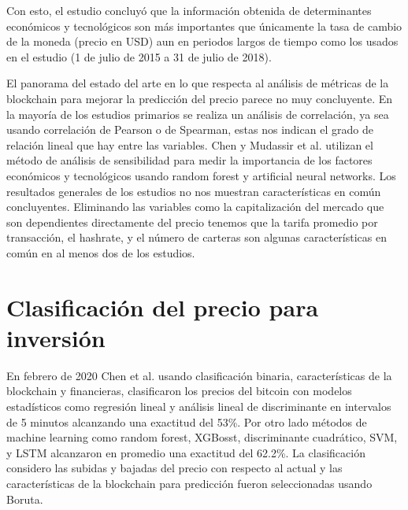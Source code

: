 Con esto, el estudio concluyó que la información obtenida de determinantes económicos y tecnológicos son más importantes que únicamente la tasa de cambio de la moneda (precio en USD) aun en periodos largos de tiempo como los usados en el estudio (1 de julio de 2015 a 31 de julio de 2018). 

El panorama del estado del arte en lo que respecta al análisis de métricas de la blockchain para mejorar la predicción del precio parece no muy concluyente. En la mayoría de los estudios primarios se realiza un análisis de correlación, ya sea usando correlación de Pearson o de Spearman, estas nos indican el grado de relación lineal que hay entre las variables. Chen y Mudassir et al. \cite{chenMachineLearningModel2021, mudassirTimeseriesForecastingBitcoin2020} utilizan el método de análisis de sensibilidad para medir la importancia de los factores económicos y tecnológicos usando random forest y artificial neural networks. Los resultados generales de los estudios no nos muestran características en común concluyentes. Eliminando las variables como la capitalización del mercado que son dependientes directamente del precio tenemos que la tarifa promedio por transacción, el hashrate, y el número de carteras son algunas características en común en al menos dos de los estudios.



\section{Clasificación del precio para inversión}
 
 
En febrero de 2020 Chen et al. \cite{chenBitcoinPricePrediction2020} usando clasificación binaria, características de la blockchain y financieras, clasificaron los precios del bitcoin con modelos estadísticos como regresión lineal y análisis lineal de discriminante en intervalos de 5 minutos alcanzando una exactitud del 53\%. Por otro lado métodos de machine learning como random forest, XGBosst, discriminante cuadrático, SVM, y LSTM alcanzaron en promedio una exactitud del 62.2\%.
La clasificación considero las subidas y bajadas del precio con respecto al actual y las características de la blockchain para predicción fueron seleccionadas usando Boruta. 



